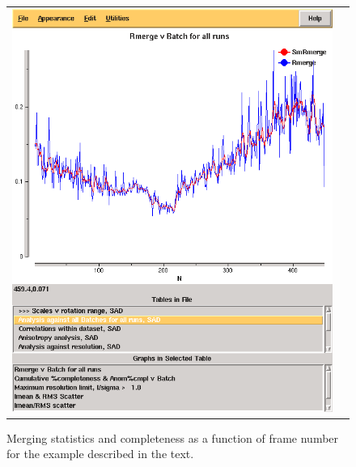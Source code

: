 \documentclass[a4paper, 11pt]{article}
\begin{document}
\begin{figure}
\caption{Merging statistics and completeness as a function of frame
  number for the example described in the
  text.\label{figure-rmerge-completeness}}
\begin{tabular}{cc}
\includegraphics[scale=0.25]{figures/3qrn-all-rmerge-aimless.png} & 

\end{tabular}
\end{figure}
\end{document}
